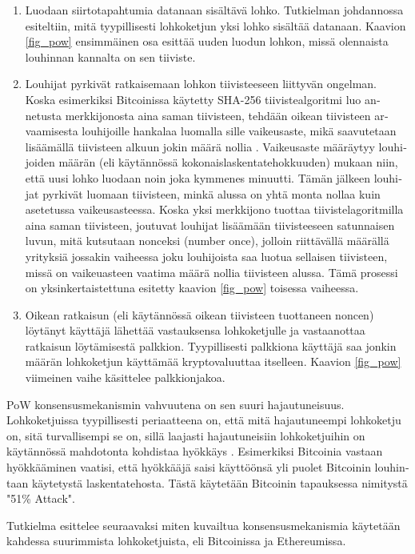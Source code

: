 \begin{otherlanguage}{english}
\begin{enumerate}
\item Luodaan siirtotapahtumia datanaan sisältävä lohko. Tutkielman johdannossa esiteltiin, mitä tyypillisesti lohkoketjun yksi lohko sisältää datanaan. Kaavion \ref{fig_pow} ensimmäinen osa esittää uuden luodun lohkon, missä olennaista louhinnan kannalta on sen tiiviste.
\item Louhijat pyrkivät ratkaisemaan lohkon tiivisteeseen liittyvän ongelman. Koska esimerkiksi Bitcoinissa käytetty SHA-256 tiivistealgoritmi luo annetusta merkkijonosta aina saman tiivisteen, tehdään oikean tiivisteen arvaamisesta louhijoille hankalaa luomalla sille vaikeusaste, mikä saavutetaan lisäämällä tiivisteen alkuun jokin määrä nollia \cite{blockchain1}. Vaikeusaste määräytyy louhijoiden määrän (eli käytännössä kokonaislaskentatehokkuuden) mukaan niin, että uusi lohko luodaan noin joka kymmenes minuutti. Tämän jälkeen louhijat pyrkivät luomaan tiivisteen, minkä alussa on yhtä monta nollaa kuin asetetussa vaikeusasteessa. Koska yksi merkkijono tuottaa tiivistelagoritmilla aina saman tiivisteen, joutuvat louhijat lisäämään tiivisteeseen satunnaisen luvun, mitä kutsutaan nonceksi (number once), jolloin riittävällä määrällä yrityksiä jossakin vaiheessa joku louhijoista saa luotua sellaisen tiivisteen, missä on vaikeuasteen vaatima määrä nollia tiivisteen alussa. Tämä prosessi on yksinkertaistettuna esitetty kaavion \ref{fig_pow} toisessa vaiheessa.
\item Oikean ratkaisun (eli käytännössä oikean tiivisteen tuottaneen noncen) löytänyt käyttäjä lähettää vastauksensa lohkoketjulle ja vastaanottaa ratkaisun löytämisestä palkkion. Tyypillisesti palkkiona käyttäjä saa jonkin määrän lohkoketjun käyttämää kryptovaluuttaa itselleen. Kaavion \ref{fig_pow} viimeinen vaihe käsittelee palkkionjakoa.
\end{enumerate}

PoW konsensusmekanismin vahvuutena on sen suuri hajautuneisuus. Lohkoketjuissa tyypillisesti periaatteena on, että mitä hajautuneempi lohkoketju on, sitä turvallisempi se on, sillä laajasti hajautuneisiin lohkoketjuihin on käytännössä mahdotonta kohdistaa hyökkäys \cite{51attack}. Esimerkiksi Bitcoinia vastaan hyökkääminen vaatisi, että hyökkääjä saisi käyttöönsä yli puolet Bitcoinin louhintaan käytetystä laskentatehosta. Tästä käytetään Bitcoinin tapauksessa nimitystä "51\% Attack".


Tutkielma esittelee seuraavaksi miten kuvailtua konsensusmekanismia käytetään kahdessa suurimmista lohkoketjuista, eli Bitcoinissa ja Ethereumissa.




\end{otherlanguage}
